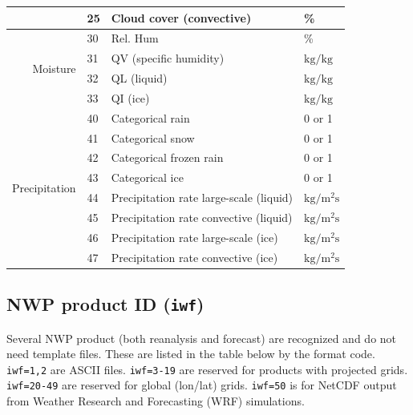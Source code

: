 \documentclass[11pt]{article}   %
\begin{document}
\begin{table}[h]
\begin{tabular}{| r | l | l | l |}
 &  25 & Cloud cover (convective) & \% \\
\hline
\multirow{4}{*}{Moisture}
  & 30 & Rel. Hum & \% \\
  & 31 & QV (specific humidity) & $\mathrm{kg/kg}$ \\
  & 32 & QL (liquid) & $\mathrm{kg/kg}$ \\
  & 33 & QI (ice) & $\mathrm{kg/kg}$ \\
\hline
\multirow{8}{*}{Precipitation}
  & 40 & Categorical rain & 0 or 1 \\
  & 41 & Categorical snow & 0 or 1 \\
  & 42 & Categorical frozen rain & 0 or 1 \\
  & 43 & Categorical ice & 0 or 1 \\
  & 44 & Precipitation rate large-scale (liquid) & $\mathrm{kg/m^2s}$ \\
  & 45 & Precipitation rate convective  (liquid) & $\mathrm{kg/m^2s}$ \\
  & 46 & Precipitation rate large-scale (ice) & $\mathrm{kg/m^2s}$ \\
  & 47 & Precipitation rate convective  (ice) & $\mathrm{kg/m^2s}$ \\
\hline
\end{tabular}
\normalsize
\end{table}

\clearpage
\subsection{NWP product ID (\texttt{iwf})}\label{Apiwf}
Several NWP product (both reanalysis and forecast) are recognized
and do not need template files.  These are listed in the table below
by the format code.  \texttt{iwf=1,2} are ASCII files.
\texttt{iwf=3-19} are reserved for products with projected grids.
\texttt{iwf=20-49} are reserved for global (lon/lat) grids.
\texttt{iwf=50} is for NetCDF output from Weather Research and 
Forecasting (WRF) simulations.
\end{document}
